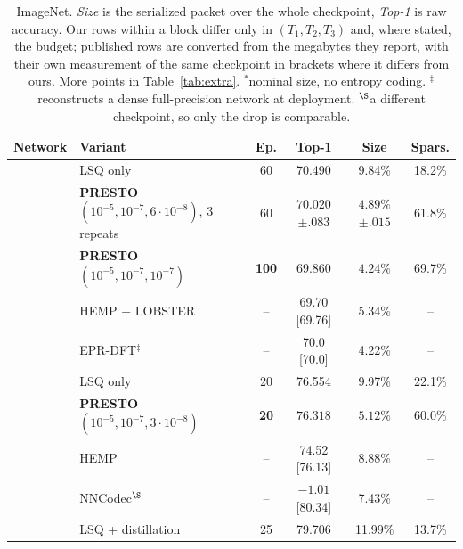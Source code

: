 \documentclass{article}
\begin{document}
\begin{table}[t]
  \caption{ImageNet. \emph{Size} is the serialized packet over the whole
  checkpoint, \emph{Top-1} is raw accuracy. Our rows within a block differ only
  in $(T_1,T_2,T_3)$ and, where stated, the budget; published rows are converted
  from the megabytes they report, with their own measurement of the same
  checkpoint in brackets where it differs from ours. More points in
  Table~\ref{tab:extra}.
  $^{*}$nominal size, no entropy coding.
  $^{\ddagger}$reconstructs a dense full-precision network at deployment.
  $^{\S}$a different checkpoint, so only the drop is comparable.}
  \label{tab:main}
  \centering \scriptsize
  \renewcommand{\arraystretch}{0.86}\setlength{\tabcolsep}{3pt}
  \begin{tabular}{llcccc}
    \toprule
    Network & Variant & Ep. & Top-1 & Size & Spars. \\
    \midrule
     & LSQ only & 60 & 70.490 & 9.84\% & 18.2\% \\
     & \textbf{PRESTO} $(10^{-5},10^{-7},6{\cdot}10^{-8})$, 3 repeats & 60 & $\mathbf{70.020}${\tiny$\pm.083$} & $\mathbf{4.89\%}${\tiny$\pm.015$} & 61.8\% \\
     & \textbf{PRESTO} $(10^{-5},10^{-7},10^{-7})$ & \textbf{100} & $\mathbf{69.860}$ & $\mathbf{4.24\%}$ & 69.7\% \\
     & HEMP + LOBSTER \citep{tartaglione2021hemp} & -- & 69.70 {\tiny[69.76]} & 5.34\% & -- \\
     & EPR-DFT$^{\ddagger}$ \citep{oktay2020epr} & -- & 70.0 {\tiny[70.0]} & 4.22\% & -- \\
    \midrule
     & LSQ only & 20 & 76.554 & 9.97\% & 22.1\% \\
     & \textbf{PRESTO} $(10^{-5},10^{-7},3{\cdot}10^{-8})$ & \textbf{20} & $\mathbf{76.318}$ & $\mathbf{5.12\%}$ & 60.0\% \\
     & HEMP \citep{tartaglione2021hemp} & -- & 74.52 {\tiny[76.13]} & 8.88\% & -- \\
     & NNCodec$^{\S}$ \citep{becking2023nncodec} & -- & $-1.01$ {\tiny[80.34]} & 7.43\% & -- \\
    \midrule
     & LSQ + distillation & 25 & 79.706 & 11.99\% & 13.7\% \\

\end{tabular}
\end{table}
\end{document}
